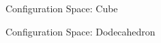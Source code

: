 \documentclass{beamer}
\begin{document}
\begin{frame}{Configuration Space: Cube}
\end{frame}
\begin{frame}{Configuration Space: Dodecahedron}
\end{frame}
\end{document}
